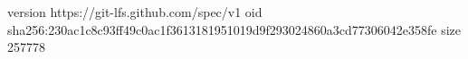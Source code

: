 version https://git-lfs.github.com/spec/v1
oid sha256:230ac1c8c93ff49c0ac1f3613181951019d9f293024860a3cd77306042e358fe
size 257778
